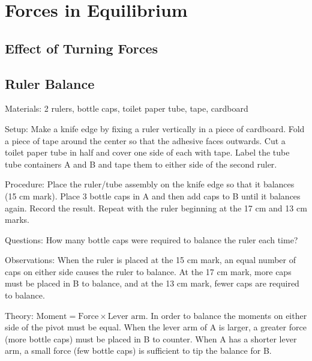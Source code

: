 \section{Forces in Equilibrium}

\begin{multicols}{2}


\section*{Effect of Turning Forces}


\subsection{Ruler Balance}


\begin{description*}
\item[Materials:]{2 rulers, bottle caps, toilet paper tube, tape, cardboard}
\item[Setup:]{Make a knife edge by fixing a ruler vertically in a piece of cardboard. Fold a piece of tape around the center so that the adhesive faces outwards. Cut a toilet paper tube in half and cover one side of each with tape. Label the tube tube containers A and B and tape them to either side of the second ruler.}
\item[Procedure:]{Place the ruler/tube assembly on the knife edge so that it balances (15 cm mark). Place 3 bottle caps in A and then add caps to B until it balances again. Record the result. Repeat with the ruler beginning at the 17 cm and 13 cm marks.}
\item[Questions:]{How many bottle caps were required to balance the ruler each time?}
\item[Observations:]{When the ruler is placed at the 15 cm mark, an equal number of caps on either side causes the ruler to balance. At the 17 cm mark, more caps must be placed in B to balance, and at the 13 cm mark, fewer caps are required to balance.}
\item[Theory:]{$\text{Moment} = \text{Force} \times \text{Lever arm}$. In order to balance the moments on either side of the pivot must be equal. When the lever arm of A is larger, a greater force (more bottle caps) must be placed in B to counter. When A has a shorter lever arm, a small force (few bottle caps) is sufficient to tip the balance for B.}
\end{description*}


\end{multicols}
